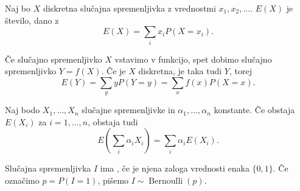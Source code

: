 
\begin{definicija}
  Naj bo $X$ diskretna slučajna spremenljivka z vrednostmi $x_1, x_2, \ldots$.
   $E(X)$ je število, dano z
  \[
	E(X) = \sum_i x_i P(X = x_i).
  \]
\end{definicija}

Če slučajno spremenljivko $X$ vstavimo v funkcijo, spet dobimo slučajno
spremenljivko $Y = f(X)$.
Če je $X$ diskretna, je taka tudi $Y$, torej
\[
  E(Y) = \sum_y y P(Y = y) = \sum_x f(x) P(X = x).
\]


\begin{izrek}
  Naj bodo $X_1, \ldots, X_n$ slučajne spremenljivke in $\alpha_1, \ldots,
  \alpha_n$ konstante.
  Če obstaja $E(X_i)$ za $i = 1, \ldots, n$, obstaja tudi
  \[
	E\left( \sum_i \alpha_i X_i \right) = \sum_i \alpha_i E(X_i).
  \]
\end{izrek}

\begin{definicija}
  Slučajna spremenljivka $I$ ima , če je
  njena zaloga vrednosti enaka $\{0, 1\}$.
  Če označimo $p = P(I = 1)$, pišemo $I \sim \operatorname{Bernoulli}(p)$.
\end{definicija}

